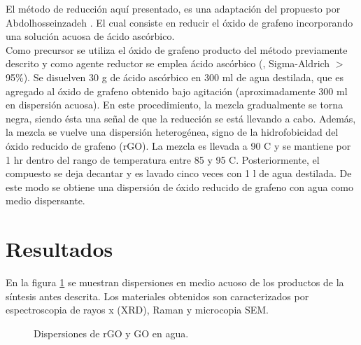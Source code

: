 El método de reducción aquí presentado, es una adaptación del propuesto por Abdolhosseinzadeh \citep{Abdolhosseinzadeh2015}. El cual consiste en reducir el óxido de grafeno incorporando una solución acuosa de ácido ascórbico.
\\
Como precursor se utiliza el óxido de grafeno producto del método previamente descrito y como agente reductor se emplea ácido ascórbico (, Sigma-Aldrich $>$95\%). Se disuelven 30 g de ácido ascórbico en 300 ml de agua destilada, que es agregado al óxido de grafeno obtenido bajo agitación (aproximadamente 300 ml en dispersión acuosa). En este procedimiento, la mezcla gradualmente se torna negra, siendo ésta una señal de que la reducción se está llevando a cabo. Además, la mezcla se vuelve una dispersión heterogénea, signo de la hidrofobicidad del óxido reducido de grafeno (rGO). La mezcla es llevada a 90 \degree C y se mantiene por 1 hr dentro del rango de temperatura entre 85 y 95 \degree C. Posteriormente, el compuesto se deja decantar y es lavado cinco veces con 1 l de agua destilada. De este modo se obtiene una dispersión de óxido reducido de grafeno con agua como medio dispersante.

\section{Resultados}
En la figura \ref{fig:RGOyGO} se muestran dispersiones en medio acuoso de los productos de la síntesis antes descrita.
Los materiales obtenidos son caracterizados por espectroscopia de rayos x (XRD), Raman y microcopia SEM.

\begin{figure}[h]
	\centering
	\caption[Dispersiones de rGO y GO en agua]{Dispersiones de rGO y GO en agua.}
	\label{fig:RGOyGO}
\end{figure}


